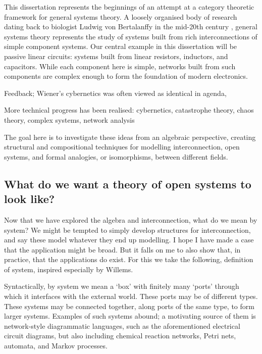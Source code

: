 
This dissertation represents the beginnings of an attempt at a category
theoretic framework for general systems theory. A loosely organised body of
research dating back to biologist Ludwig von Bertalanffy in the mid-20th
century \cite{Ber}, general systems theory represents the study of systems built
from rich interconnections of simple component systems. Our central example in
this dissertation will be passive linear circuits: systems built from linear
resistors, inductors, and capacitors.  While each component here is simple,
networks built from such components are complex enough to form the foundation of
modern electronics.

Feedback; Wiener's cybernetics was often viewed as identical in agenda, 

More technical progress has been realised: cybernetics, catastrophe theory,
chaos theory, complex systems, network analysis

The goal here is to investigate these ideas from an algebraic perspective,
creating structural and compositional techniques for modelling
interconnection, open systems, and formal analogies, or isomorphisms, between
different fields.



\subsection*{What do we want a theory of open systems to look like?}

Now that we have explored the algebra and interconnection, what do we mean by
system? We might be tempted to simply develop structures for interconnection,
and say these model whatever they end up modelling. I hope I have made a case
that the application might be broad. But it falls on me to also show that, in
practice, that the applications do exist. For this we take the following,
definition of system, inspired especially by Willems.

Syntactically, by system we mean a `box' with finitely many `ports' through which it
interfaces with the external world. These ports may be of different types. These
systems may be connected together, along ports of the same type, to form larger
systems. Examples of such systems abound; a motivating source of them is
network-style diagrammatic languages, such as the aforementioned electrical
circuit diagrams, but also including chemical reaction networks, Petri nets,
automata, and Markov processes.

